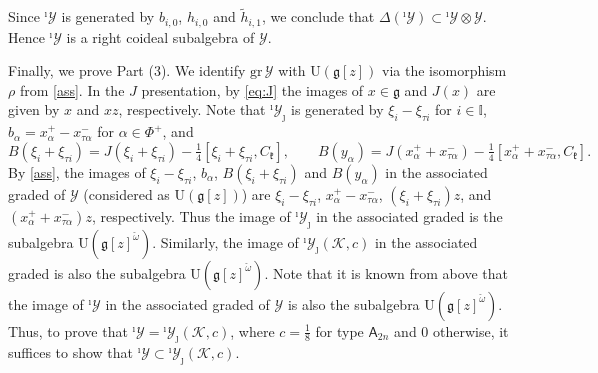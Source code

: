 \documentclass[11pt,reqno]{amsart}
\numberwithin{equation}{section}
\theoremstyle{definition}
\theoremstyle{remark}
\newcommand{\g}{\mathfrak{g}}
\newcommand{\tl}{\tilde}
\newcommand{\I}{{\mathbb I}}
\newcommand{\Y}{{\mathscr{Y}}}
\newcommand{\Yi}{{^\imath\mathscr{Y}}}
\newcommand{\YiJ}{{^\imath\mathscr{Y}_{\jmath}}}
\begin{document}
Since $\Yi$ is generated by $b_{i,0}$, $h_{i,0}$ and $\tl h_{i,1}$, we conclude that $\Delta(\Yi)\subset \Yi\otimes \Y$. Hence $\Yi$ is a right coideal subalgebra of $\Y$.

Finally, we prove Part (3). We identify $\mathrm{gr}\,\Y$ with   $\mathrm{U}(\g[z])$ via the isomorphism $\rho$ from \eqref{ass}. In the $J$ presentation, by \eqref{eq:J} the images of $x\in \g$ and $J(x)$ are given by $x$ and $xz$, respectively. Note that $\YiJ$ is generated by $\xi_{i}-\xi_{\tau i}$ for $i\in \I$, $b_{\alpha}=x_{\alpha}^+-x_{\tau \alpha}^-$ for $\alpha\in \Phi^+$, and
\[
B(\xi_i+\xi_{\tau i})=J(\xi_i+\xi_{\tau i})-\tfrac14[\xi_i+\xi_{\tau i},C_{\mathfrak k}],\qquad B(y_\alpha)=J(x_{\alpha}^++x_{\tau \alpha}^-)-\tfrac14[x_{\alpha}^++x_{\tau\alpha}^-,C_{\mathfrak k}].
\]
By \eqref{ass}, the images of $\xi_{i}-\xi_{\tau i}$, $b_{\alpha}$, $B(\xi_i+\xi_{\tau i})$ and $B(y_\alpha)$ in the associated graded of $\Y$ (considered as $\mathrm{U}(\g[z])$) are $\xi_{i}-\xi_{\tau i}$, $x_{\alpha}^+-x_{\tau\alpha}^-$, $(\xi_i+\xi_{\tau i})z$, and $(x_{\alpha}^++x_{\tau\alpha}^-)z$, respectively. Thus the image of $\YiJ$ in the associated graded is the subalgebra $\mathrm{U}(\g[z]^{\check \omega})$. Similarly, the image of $\YiJ(\mathscr K,c)$ in the associated graded is also the subalgebra $\mathrm{U}(\g[z]^{\check \omega})$. Note that it is known from above that the image of $\Yi$ in the associated graded of $\Y$ is also the subalgebra $\mathrm{U}(\g[z]^{\check \omega})$. 
Thus, to prove that $\Yi=\YiJ(\mathscr K,c)$, where $c=\tfrac18$ for type $\mathsf A_{2n}$ and $0$ otherwise, it suffices to show that $\Yi\subset \YiJ(\mathscr K,c)$. 
\end{document}
